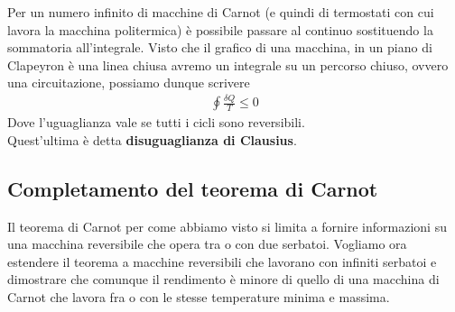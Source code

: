 \documentclass[
10pt, %
a4paper, %
oneside, %
headinclude,footinclude, %
BCOR5mm, %
]{scrartcl}
\begin{document}
Per un numero infinito di macchine di Carnot (e quindi di termostati con cui lavora la macchina politermica) è possibile passare al continuo sostituendo la sommatoria all'integrale. Visto che il grafico di una macchina, in un piano di Clapeyron è una linea chiusa avremo un integrale su un percorso chiuso, ovvero una circuitazione, possiamo dunque scrivere
\begin{align*}
	\oint \frac{\delta Q}{T}\leq 0
\end{align*}
Dove l'uguaglianza vale se tutti i cicli sono reversibili.\\
Quest'ultima è detta \textbf{disuguaglianza di Clausius}.
\subsection{Completamento del teorema di Carnot}
Il teorema di Carnot per come abbiamo visto si limita a fornire informazioni su una macchina reversibile che opera tra o con due serbatoi. Vogliamo ora estendere il teorema a macchine reversibili che lavorano con infiniti serbatoi e dimostrare che comunque il rendimento è minore di quello di una macchina di Carnot che lavora fra o con le stesse temperature minima e massima.\\
\end{document}
